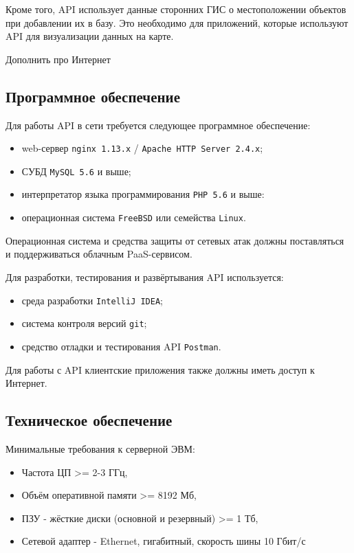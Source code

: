 	Кроме того, API использует данные сторонних ГИС о местоположении объектов при добавлении их в базу. Это необходимо для приложений, которые используют API для визуализации данных на карте.

	{\color{blue} Дополнить про Интернет}

\subsection{Программное обеспечение}

\par

	Для работы API в сети требуется следующее программное обеспечение:

	\begin{itemize}
		\item web-сервер \texttt{nginx 1.13.x} / \texttt{Apache HTTP Server 2.4.x};
		\item СУБД \texttt{MySQL 5.6} и выше;
		\item интерпретатор языка программирования \texttt{PHP 5.6} и выше:
		\item операционная система \texttt{FreeBSD} или семейства \texttt{Linux}.
	\end{itemize}
	
	Операционная система и средства защиты от сетевых атак должны поставляться и поддерживаться облачным PaaS-сервисом.
	
\par
	Для разработки, тестирования и развёртывания API используется:

	\begin{itemize}
		\item среда разработки \texttt{IntelliJ IDEA};
		\item система контроля версий \texttt{git};
		\item средство отладки и тестирования API \texttt{Postman}.
	\end{itemize}
 
	Для работы с API клиентские приложения также должны иметь доступ к Интернет.

\subsection{Техническое обеспечение}

\par

	Минимальные требования к серверной ЭВМ:

	\begin{itemize}
		\item Частота ЦП >= 2-3 ГГц, 
		\item Объём оперативной памяти >= 8192 Мб,
		\item ПЗУ - жёсткие диски (основной и резервный) >= 1 Тб,
		\item Сетевой адаптер - Ethernet, гигабитный, скорость шины 10 Гбит/с
	\end{itemize}

